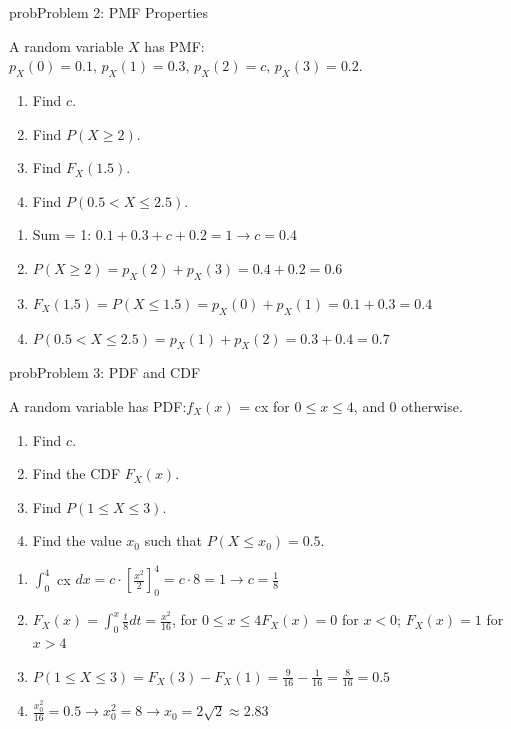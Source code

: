 \begin{PSbox}[unbreakable]{prob}{Problem 2: PMF Properties}

A random variable $X$ has PMF: $p_{X}(0) = 0.1,\, p_{X}(1) = 0.3,\, p_{X}(2) = c,\, p_{X}(3) = 0.2$.

\begin{enumerate}
\def\labelenumi{(\alph{enumi})}
\tightlist
\item
  Find $c$.
\item
  Find $P(X \ge 2)$.
\item
  Find $F_{X}(1.5)$.
\item
  Find $P(0.5 < X \le 2.5)$.
\end{enumerate}

\PSsolution{} 

\begin{enumerate}
\def\labelenumi{(\alph{enumi})}
\item
  Sum = 1: $0.1 + 0.3 + c + 0.2 = 1 \to c = 0.4$
\item
  $P(X \ge 2) = p_{X}(2) + p_{X}(3) = 0.4 + 0.2 = 0.6$
\item
  $F_{X}(1.5) = P(X \le 1.5) = p_{X}(0) + p_{X}(1) = 0.1 + 0.3 = 0.4$
\item
  $P(0.5 < X \le 2.5) = p_{X}(1) + p_{X}(2) = 0.3 + 0.4 = 0.7$
\end{enumerate}

\end{PSbox}

\begin{PSbox}[unbreakable]{prob}{Problem 3: PDF and CDF}

A random variable has PDF:\PSbr{}$f_{X}(x)$ = cx for $0 \le x \le 4$, and 0 otherwise.

\begin{enumerate}
\def\labelenumi{(\alph{enumi})}
\tightlist
\item
  Find $c$.
\item
  Find the CDF $F_{X}(x)$.
\item
  Find $P(1 \le X \le 3)$.
\item
  Find the value $x_{0}$ such that $P(X \le x_{0}) = 0.5$.
\end{enumerate}

\PSsolution{} 

\begin{enumerate}
\def\labelenumi{(\alph{enumi})}
\item
  $\int_{0}^{4}$ cx $dx = c \cdot \left[\frac{x^{2}}{2}\right]_{0}^{4} = c \cdot 8 = 1 \to c = \frac{1}{8}$
\item
  $F_{X}(x) = \int_{0}^{x} \frac{t}{8}dt = \frac{x^{2}}{16}$, for $0 \le x \le 4$\PSbr{}$F_{X}(x) = 0$ for $x < 0$; $F_{X}(x) = 1$ for $x > 4$
\item
  $\displaystyle P(1 \le X \le 3) = F_{X}(3) - F_{X}(1) = \frac{9}{16} - \frac{1}{16} = \frac{8}{16} = 0.5$
\item
  $\displaystyle \frac{x_{0}^{2}}{16} = 0.5 \to x_{0}^{2} = 8 \to x_{0} = 2\sqrt{2} \approx 2.83$
\end{enumerate}

\end{PSbox}

